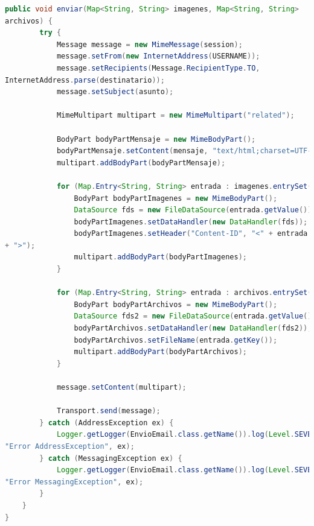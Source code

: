 \documentclass[a4paper,12pt]{article}
\begin{document}
\begin{lstlisting}[language=Java, style=customJava, 
caption={EnvioEmail.java}, captionpos=b,basicstyle=\fontfamily{cmss}\small]
    public void enviar(Map<String, String> imagenes, Map<String, String> 
archivos) {
        try {
            Message message = new MimeMessage(session);
            message.setFrom(new InternetAddress(USERNAME));
            message.setRecipients(Message.RecipientType.TO, 
InternetAddress.parse(destinatario));
            message.setSubject(asunto);
            
            MimeMultipart multipart = new MimeMultipart("related");
            
            BodyPart bodyPartMensaje = new MimeBodyPart();
            bodyPartMensaje.setContent(mensaje, "text/html;charset=UTF-8");
            multipart.addBodyPart(bodyPartMensaje);
            
            for (Map.Entry<String, String> entrada : imagenes.entrySet()) {
                BodyPart bodyPartImagenes = new MimeBodyPart();
                DataSource fds = new FileDataSource(entrada.getValue());
                bodyPartImagenes.setDataHandler(new DataHandler(fds));
                bodyPartImagenes.setHeader("Content-ID", "<" + entrada.getKey() 
+ ">");
                multipart.addBodyPart(bodyPartImagenes);
            }
            
            for (Map.Entry<String, String> entrada : archivos.entrySet()) {
                BodyPart bodyPartArchivos = new MimeBodyPart();
                DataSource fds2 = new FileDataSource(entrada.getValue());
                bodyPartArchivos.setDataHandler(new DataHandler(fds2));
                bodyPartArchivos.setFileName(entrada.getKey());
                multipart.addBodyPart(bodyPartArchivos);
            }
            
            message.setContent(multipart);
            
            Transport.send(message);
        } catch (AddressException ex) {
            Logger.getLogger(EnvioEmail.class.getName()).log(Level.SEVERE, 
"Error AddressException", ex);
        } catch (MessagingException ex) {
            Logger.getLogger(EnvioEmail.class.getName()).log(Level.SEVERE, 
"Error MessagingException", ex);
        }
    }
}

\end{lstlisting}
\end{document}
